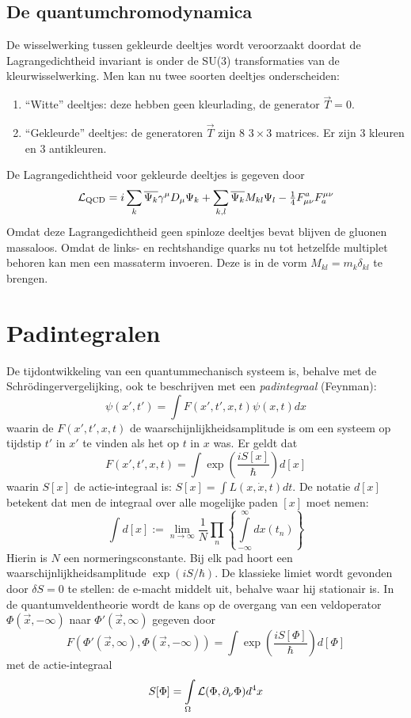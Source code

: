 \documentclass[twoside]{report}
\begin{document}
\subsection[~~De quantumchromodynamica]{De quantumchromodynamica}
De wisselwerking tussen gekleurde deeltjes wordt veroorzaakt doordat de
Lagrangedichtheid invariant is onder de SU(3) transformaties van de
kleurwisselwerking. Men kan nu twee soorten deeltjes onderscheiden:
\begin{enumerate}
\item ``Witte'' deeltjes: deze hebben geen kleurlading, de generator $\vec{T}=0$.
\item ``Gekleurde'' deeltjes: de generatoren $\vec{T}$ zijn 8 $3\times3$
      matrices. Er zijn 3 kleuren en 3 antikleuren.
\end{enumerate}
De Lagrangedichtheid voor gekleurde deeltjes is gegeven door
\[
{\cal L}_{\rm QCD}=i\sum_k\overline{\Psi_k}\gamma^\mu D_\mu\Psi_k+
\sum_{k,l}\overline{\Psi_k}M_{kl}\Psi_l-\mbox{$\frac{1}{4}$} F^a_{\mu\nu}F_a^{\mu\nu}
\]
Omdat deze Lagrangedichtheid geen spinloze deeltjes bevat blijven de
gluonen massaloos. Omdat de links- en rechtshandige quarks nu tot hetzelfde
multiplet behoren kan men een massaterm invoeren. Deze is in de vorm
$M_{kl}=m_k\delta_{kl}$ te brengen.

\section[~~Padintegralen]{Padintegralen}
De tijdontwikkeling van een quantummechanisch systeem is, behalve met de
Schr\"odingervergelijking, ook te beschrijven met een {\it padintegraal}
(Feynman):
\[
\psi(x',t')=\int F(x',t',x,t)\psi(x,t)dx
\]
waarin de $F(x',t',x,t)$ de waarschijnlijkheidsamplitude is om een systeem op
tijdstip $t'$ in $x'$ te vinden als het op $t$ in $x$ was. Er geldt dat
\[
F(x',t',x,t)=\int\exp\left(\frac{iS[x]}{\hbar}\right)d[x]
\]
waarin $S[x]$ de actie-integraal is: $S[x]=\int L(x,\dot{x},t)dt$. De notatie
$d[x]$ betekent dat men de integraal over alle mogelijke paden $[x]$ moet
nemen:
\[
\int d[x]:=\lim_{n\rightarrow\infty}\frac{1}{N}\prod_n\left\{\int\limits_{-\infty}^\infty dx(t_n)\right\}
\]
Hierin is $N$ een normeringsconstante. Bij elk pad hoort een
waarschijnlijkheidsamplitude $\exp(iS/\hbar)$. De klassieke limiet wordt
gevonden door $\delta S=0$ te stellen: de e-macht middelt uit, behalve waar
hij stationair is. In de quantumveldentheorie wordt de kans op de overgang
van een veldoperator $\Phi(\vec{x},-\infty)$ naar $\Phi'(\vec{x},\infty)$
gegeven door
\[
F(\Phi'(\vec{x},\infty),\Phi(\vec{x},-\infty))=\int\exp\left(\frac{iS[\Phi]}{\hbar}\right)d[\Phi]
\]
met de actie-integraal
\[
S[\Phi]=\int\limits_\Omega {\cal L}(\Phi,\partial_\nu\Phi)d^4x
\]
\end{document}
